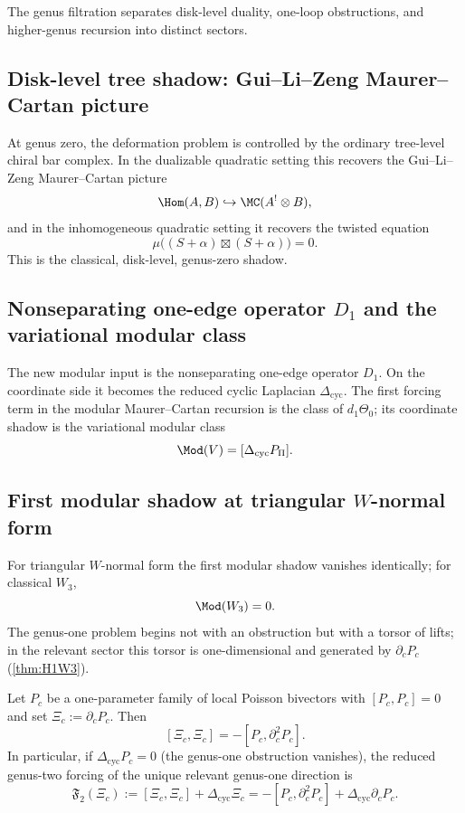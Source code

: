 The genus filtration separates disk-level duality, one-loop
obstructions, and higher-genus recursion into distinct sectors.

\subsection{Disk-level tree shadow: Gui--Li--Zeng Maurer--Cartan picture}

At genus zero, the deformation problem is controlled by the ordinary tree-level chiral bar
complex. In the dualizable quadratic setting this recovers the Gui--Li--Zeng Maurer--Cartan
picture
\[
\Hom(A,B)\hookrightarrow \MC(A^!\otimes B),
\]
and in the inhomogeneous quadratic setting it recovers the twisted equation
\[
\mu\big((S+\alpha)\boxtimes(S+\alpha)\big)=0.
\]
This is the classical, disk-level, genus-zero shadow.

\subsection{Nonseparating one-edge operator $D_1$ and the variational modular class}

The new modular input is the nonseparating one-edge operator $D_1$. On the coordinate side
it becomes the reduced cyclic Laplacian $\Delta_{\mathrm{cyc}}$. The first forcing term in the
modular Maurer--Cartan recursion is the class of $d_1\Theta_0$; its coordinate shadow is the
variational modular class
\[
\Mod(V)=[\Delta_{\mathrm{cyc}}P_\Pi].
\]

\subsection{First modular shadow at triangular $W$-normal form}

For triangular $W$-normal form the first modular shadow vanishes identically; for classical $W_3$,
\[
\Mod(W_3)=0.
\]
The genus-one problem begins not with an obstruction but with a torsor of lifts; in the
relevant sector this torsor is one-dimensional and generated by $\partial_cP_c$
(\cref{thm:H1W3}).

\begin{proposition}
\label{prop:quadratic-genus-two-line}
Let $P_c$ be a one-parameter family of local Poisson bivectors with
$[P_c,P_c]=0$ and set $\Xi_c:=\partial_cP_c$. Then
\[
[\Xi_c,\Xi_c]=-[P_c,\partial_c^2P_c].
\]
In particular, if $\Delta_{\mathrm{cyc}}P_c=0$ \textup{(}the genus-one
obstruction vanishes\textup{)}, the reduced genus-two forcing of the
unique relevant genus-one direction is
\[
\mathfrak{F}_2(\Xi_c)
:=
[\Xi_c,\Xi_c]+\Delta_{\mathrm{cyc}}\Xi_c
=
-[P_c,\partial_c^2P_c]+\Delta_{\mathrm{cyc}}\partial_cP_c.
\]
\end{proposition}

